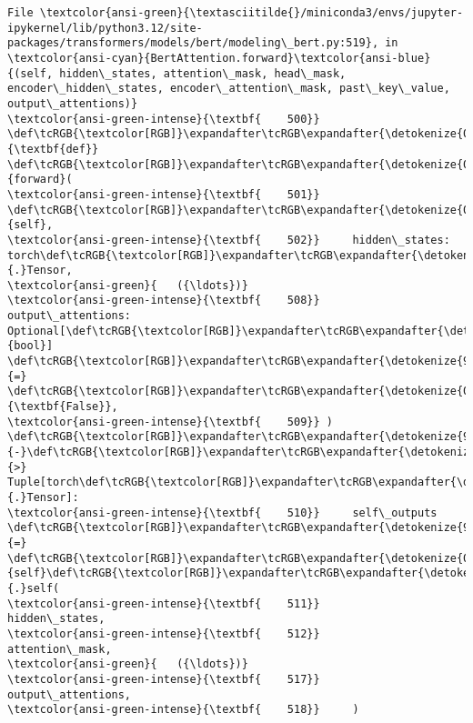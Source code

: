 \documentclass[11pt]{article}
\begin{document}
\begin{Verbatim}[commandchars=\\\{\}, frame=single, framerule=2mm, rulecolor=\color{outerrorbackground}]
File \textcolor{ansi-green}{\textasciitilde{}/miniconda3/envs/jupyter-ipykernel/lib/python3.12/site-packages/transformers/models/bert/modeling\_bert.py:519}, in \textcolor{ansi-cyan}{BertAttention.forward}\textcolor{ansi-blue}{(self, hidden\_states, attention\_mask, head\_mask, encoder\_hidden\_states, encoder\_attention\_mask, past\_key\_value, output\_attentions)}
\textcolor{ansi-green-intense}{\textbf{    500}} \def\tcRGB{\textcolor[RGB]}\expandafter\tcRGB\expandafter{\detokenize{0,135,0}}{\textbf{def}} \def\tcRGB{\textcolor[RGB]}\expandafter\tcRGB\expandafter{\detokenize{0,0,255}}{forward}(
\textcolor{ansi-green-intense}{\textbf{    501}}     \def\tcRGB{\textcolor[RGB]}\expandafter\tcRGB\expandafter{\detokenize{0,135,0}}{self},
\textcolor{ansi-green-intense}{\textbf{    502}}     hidden\_states: torch\def\tcRGB{\textcolor[RGB]}\expandafter\tcRGB\expandafter{\detokenize{98,98,98}}{.}Tensor,
\textcolor{ansi-green}{   ({\ldots})}
\textcolor{ansi-green-intense}{\textbf{    508}}     output\_attentions: Optional[\def\tcRGB{\textcolor[RGB]}\expandafter\tcRGB\expandafter{\detokenize{0,135,0}}{bool}] \def\tcRGB{\textcolor[RGB]}\expandafter\tcRGB\expandafter{\detokenize{98,98,98}}{=} \def\tcRGB{\textcolor[RGB]}\expandafter\tcRGB\expandafter{\detokenize{0,135,0}}{\textbf{False}},
\textcolor{ansi-green-intense}{\textbf{    509}} ) \def\tcRGB{\textcolor[RGB]}\expandafter\tcRGB\expandafter{\detokenize{98,98,98}}{-}\def\tcRGB{\textcolor[RGB]}\expandafter\tcRGB\expandafter{\detokenize{98,98,98}}{>} Tuple[torch\def\tcRGB{\textcolor[RGB]}\expandafter\tcRGB\expandafter{\detokenize{98,98,98}}{.}Tensor]:
\textcolor{ansi-green-intense}{\textbf{    510}}     self\_outputs \def\tcRGB{\textcolor[RGB]}\expandafter\tcRGB\expandafter{\detokenize{98,98,98}}{=} \def\tcRGB{\textcolor[RGB]}\expandafter\tcRGB\expandafter{\detokenize{0,135,0}}{self}\def\tcRGB{\textcolor[RGB]}\expandafter\tcRGB\expandafter{\detokenize{98,98,98}}{.}self(
\textcolor{ansi-green-intense}{\textbf{    511}}         hidden\_states,
\textcolor{ansi-green-intense}{\textbf{    512}}         attention\_mask,
\textcolor{ansi-green}{   ({\ldots})}
\textcolor{ansi-green-intense}{\textbf{    517}}         output\_attentions,
\textcolor{ansi-green-intense}{\textbf{    518}}     )

\end{Verbatim}
\end{document}
